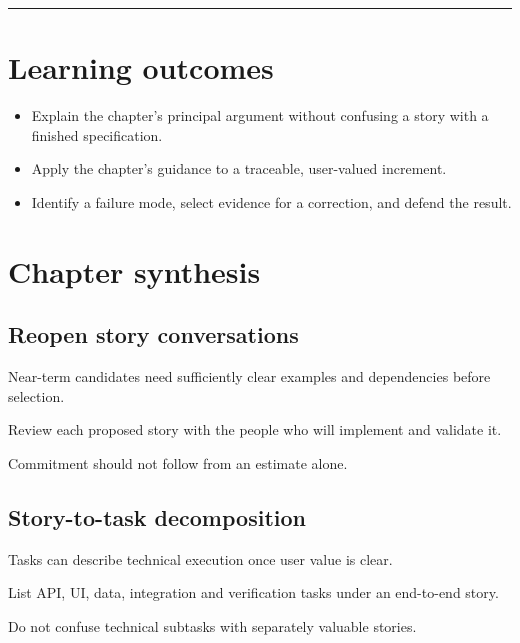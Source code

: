 \documentclass[11pt,letterpaper]{article}
\begin{document}
\tableofcontents\medskip\noindent\rule{\linewidth}{0.4pt}\medskip
\section{Learning outcomes}
\begin{itemize}[leftmargin=*,itemsep=2pt]
\item Explain the chapter's principal argument without confusing a story with a finished specification.
\item Apply the chapter's guidance to a traceable, user-valued increment.
\item Identify a failure mode, select evidence for a correction, and defend the result.
\end{itemize}
\section{Chapter synthesis}
\subsection{Reopen story conversations}
Near-term candidates need sufficiently clear examples and dependencies before selection.

\begin{tcolorbox}[colback=tealback,colframe=navy,title={Engineering translation},breakable]
Review each proposed story with the people who will implement and validate it.

\end{tcolorbox}
\begin{tcolorbox}[colback=amberback,colframe=navy,title={Failure mode to watch},breakable]
Commitment should not follow from an estimate alone.

\end{tcolorbox}
\subsection{Story-to-task decomposition}
Tasks can describe technical execution once user value is clear.

\begin{tcolorbox}[colback=tealback,colframe=navy,title={Engineering translation},breakable]
List API, UI, data, integration and verification tasks under an end-to-end story.

\end{tcolorbox}
\begin{tcolorbox}[colback=amberback,colframe=navy,title={Failure mode to watch},breakable]
Do not confuse technical subtasks with separately valuable stories.

\end{tcolorbox}
\end{document}
